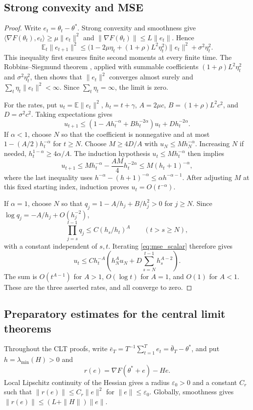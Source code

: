 \subsection{Strong convexity and MSE}
\begin{proof}
Write $e_t=\theta_t-\theta^*$. Strong convexity and smoothness give
$\langle\nabla F(\theta_t),e_t\rangle\ge\mu\|e_t\|^2$ and
$\|\nabla F(\theta_t)\|\le L\|e_t\|$. Hence
\begin{equation}\label{eq:strong_recursion}
\mathbb E_t\|e_{t+1}\|^2
\le\bigl(1-2\mu\eta_t+(1+\rho)L^2\eta_t^2\bigr)\|e_t\|^2
+\sigma^2\eta_t^2.
\end{equation}
This inequality first ensures finite second moments at every finite time.
The Robbins--Siegmund theorem \cite{robbinssiegmund1971}, applied with
summable coefficients $(1+\rho)L^2\eta_t^2$ and $\sigma^2\eta_t^2$,
then shows that $\|e_t\|^2$ converges almost surely and
$\sum_t\eta_t\|e_t\|^2<\infty$. Since $\sum_t\eta_t=\infty$,
the limit is zero.

For the rates, put $u_t=\mathbb E\|e_t\|^2$, $h_t=t+\gamma$,
$A=2\mu c$, $B=(1+\rho)L^2c^2$, and $D=\sigma^2c^2$.
Taking expectations gives
\begin{equation}\label{eq:mse_scalar}
u_{t+1}\le(1-Ah_t^{-\alpha}+Bh_t^{-2\alpha})u_t
+Dh_t^{-2\alpha}.
\end{equation}
If $\alpha<1$, choose $N$ so that the coefficient is nonnegative and
at most $1-(A/2)h_t^{-\alpha}$ for $t\ge N$.
Choose $M\ge4D/A$ with $u_N\le Mh_N^{-\alpha}$.
Increasing $N$ if needed, $h_t^{1-\alpha}\ge4\alpha/A$.
The induction hypothesis $u_t\le Mh_t^{-\alpha}$ then implies
\[
u_{t+1}\le Mh_t^{-\alpha}-\frac{AM}{4}h_t^{-2\alpha}
\le M(h_t+1)^{-\alpha},
\]
where the last inequality uses
$h^{-\alpha}-(h+1)^{-\alpha}\le\alpha h^{-\alpha-1}$.
After adjusting $M$ at this fixed starting index, induction proves
$u_t=O(t^{-\alpha})$.

If $\alpha=1$, choose $N$ so that $q_j=1-A/h_j+B/h_j^2>0$ for
$j\ge N$. Since $\log q_j=-A/h_j+O(h_j^{-2})$,
\[
\prod_{j=s}^{t-1}q_j\le C(h_s/h_t)^A\qquad(t>s\ge N),
\]
with a constant independent of $s,t$. Iterating \eqref{eq:mse_scalar}
therefore gives
\[
u_t\le C h_t^{-A}
\left(h_N^Au_N+D\sum_{s=N}^{t-1}h_s^{A-2}\right).
\]
The sum is $O(t^{A-1})$ for $A>1$, $O(\log t)$ for $A=1$,
and $O(1)$ for $A<1$. These are the three asserted rates, and all
converge to zero.
\end{proof}

\subsection{Preparatory estimates for the central limit theorems}
\label{app:clt_preparation}
Throughout the CLT proofs, write
$\bar e_T=T^{-1}\sum_{t=1}^Te_t=\bar\theta_T-\theta^*$,
and put $h=\lambda_{\min}(H)>0$ and
\[
r(e)=\nabla F(\theta^*+e)-He.
\]
Local Lipschitz continuity of the Hessian gives a radius $\varepsilon_0>0$
and a constant $C_r$ such that
$\|r(e)\|\le C_r\|e\|^2$ for $\|e\|\le\varepsilon_0$.
Globally, smoothness gives $\|r(e)\|\le(L+\|H\|)\|e\|$.

